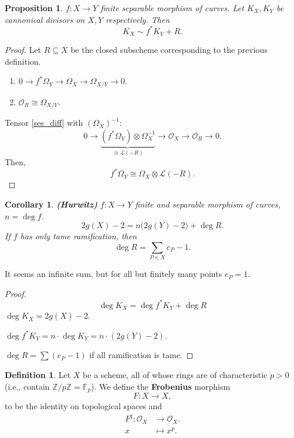 \documentclass[12pt]{article}
\newtheorem*{proposition}{Proposition}
\newtheorem*{corollary}{Corollary}
\theoremstyle{definition}
\newtheorem*{definition}{Definition}
\begin{document}
\begin{proposition}
$f:X\rightarrow Y$ finite separable morphism of curves. Let $K_X,K_Y$ be cannonical divisors on $X,Y$ respectively. Then
\[K_X\sim f^*K_Y+R.\]
\end{proposition}

\begin{proof}
Let $R\subseteq X$ be the closed subscheme corresponding to the previous definition.
\begin{enumerate}[label=\arabic*)]
\item\label{ses_diff} $0\longrightarrow f^*\Omega_Y\longrightarrow\Omega_X\longrightarrow\Omega_{X/Y}\longrightarrow0$.
\item $\mathcal O_R\cong\Omega_{X/Y}$.
\end{enumerate}

Tensor \ref{ses_diff} with $(\Omega_X)^{-1}$:
\[0\longrightarrow\underbrace{(f^*\Omega_Y)\otimes\Omega_X^{-1}}_{\cong\mathcal L(-R)}\longrightarrow\mathcal O_X\longrightarrow\mathcal O_R\longrightarrow0.\]
Then,
\[f^*\Omega_Y\cong\Omega_X\otimes\mathcal L(-R).\]
\end{proof}

\begin{corollary}
\emph{\textbf{(Hurwitz)}} $f:X\rightarrow Y$ finite and separable morphism of curves, $n=\deg f$.
\[2g(X)-2=n\big(2g(Y)-2\big)+\deg R.\]
If $f$ has only tame ramification, then
\[\deg R=\sum_{P\in X}e_P-1.\]
\end{corollary}

It seems an infinite sum, but for all but finitely many points $e_P=1$.

\begin{proof}
\[\deg K_X=\deg f^*K_Y+\deg R\]
$\deg K_X=2g(X)-2$.

$\deg f^*K_Y=n\cdot\deg K_Y=n\cdot(2g(Y)-2)$.

$\deg R=\sum(e_P-1)$ if all ramification is tame.
\end{proof}

\begin{definition}
Let $X$ be a scheme, all of whose rings are of characteristic $p>0$ (i.e., contain $\mathbb Z/p\mathbb Z=\mathbb F_p$). We define the \textbf{Frobenius} morphism
\[F:X\longrightarrow X,\]
to be the identity on topological spaces and
\begin{align*}\tag{$p$-th power map}
F^\sharp:\mathcal O_X&\longrightarrow\mathcal O_X.\\x&\longmapsto x^p.
\end{align*}
\end{definition}
\end{document}
